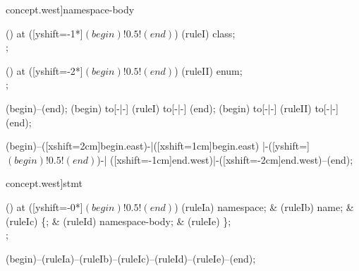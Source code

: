 \begin{syntax}[[xshift=34mm]concept.west]{namespace-body}
  
  \node[sequence] () at ([yshift=-1*\syntaxruledist]$(begin)!0.5!(end)$) {
    \node[nonterminal] (ruleI) {class};
    \\
  };
  
  \node[sequence] () at ([yshift=-2*\syntaxruledist]$(begin)!0.5!(end)$) {
    \node[nonterminal] (ruleII) {enum};
    \\
  };
  
  \draw[path] (begin)--(end);
  \draw[path] (begin) to[-|-] (ruleI) to[-|-] (end);
  \draw[path] (begin) to[-|-] (ruleII) to[-|-] (end);
  
  \draw[path]
    (begin)--([xshift=2cm]begin.east)-|([xshift=1cm]begin.east)
    |-([yshift=\syntaxruledist]$(begin)!0.5!(end)$)-|
    ([xshift=-1cm]end.west)|-([xshift=-2cm]end.west)--(end);
\end{syntax}

\begin{syntax}[[xshift=34mm]concept.west]{stmt}
  
  \node[sequence] () at ([yshift=-0*\syntaxruledist]$(begin)!0.5!(end)$) {
    \node[terminal]    (ruleIa) {namespace};
    &
    \node[nonterminal] (ruleIb) {name};
    &
    \node[terminal]    (ruleIc) {\{};
    &
    \node[nonterminal] (ruleId) {namespace-body};
    &
    \node[terminal]    (ruleIe) {\}};
    \\
  };
  
  \draw[path] (begin)--(ruleIa)--(ruleIb)--(ruleIc)--(ruleId)--(ruleIe)--(end);
\end{syntax}
